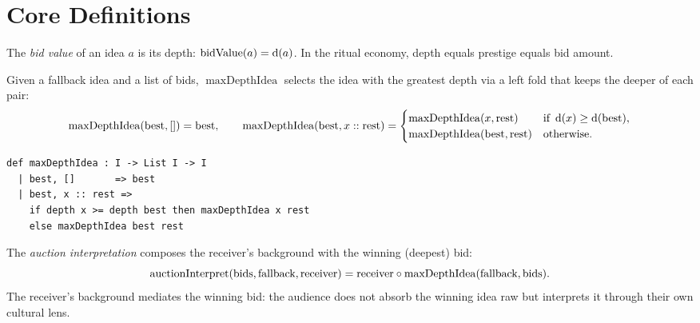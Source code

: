 \section{Core Definitions}
\label{sec:ch14-defs}

\begin{definition}
\label{def:bid-value}
The \emph{bid value} of an idea $a$ is its depth:
$\operatorname{bidValue}(a) = \operatorname{d}(a)$.
In the ritual economy, depth equals prestige equals bid amount.
\end{definition}

\begin{definition}
\label{def:max-depth}
Given a fallback idea and a list of bids, $\operatorname{maxDepthIdea}$
selects the idea with the greatest depth via a left fold that keeps the
deeper of each pair:
\[
  \operatorname{maxDepthIdea}(\text{best}, []) = \text{best}, \qquad
  \operatorname{maxDepthIdea}(\text{best}, x :: \text{rest}) =
  \begin{cases}
    \operatorname{maxDepthIdea}(x, \text{rest}) & \text{if } \operatorname{d}(x) \ge \operatorname{d}(\text{best}), \\
    \operatorname{maxDepthIdea}(\text{best}, \text{rest}) & \text{otherwise}.
  \end{cases}
\]
\end{definition}

\begin{lstlisting}[caption={Maximum depth idea selector in Lean~4}]
def maxDepthIdea : I -> List I -> I
  | best, []       => best
  | best, x :: rest =>
    if depth x >= depth best then maxDepthIdea x rest
    else maxDepthIdea best rest
\end{lstlisting}

\begin{definition}
\label{def:auction-interp}
The \emph{auction interpretation} composes the receiver's background with
the winning (deepest) bid:
\[
  \operatorname{auctionInterpret}(\text{bids}, \text{fallback}, \text{receiver})
  = \text{receiver} \circ \operatorname{maxDepthIdea}(\text{fallback}, \text{bids}).
\]
The receiver's background mediates the winning bid: the audience does not
absorb the winning idea raw but interprets it through their own cultural
lens.
\end{definition}

